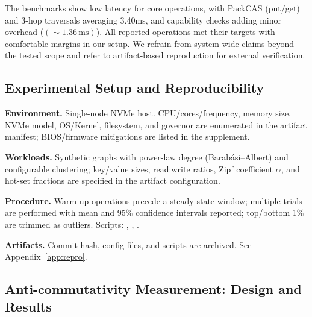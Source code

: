 \documentclass[10pt]{article}
\begin{document}
The benchmarks show low latency for core operations, with PackCAS (put/get) and 3-hop traversals averaging 3.40ms, and capability checks adding minor overhead ($(\sim 1.36\,\mathrm{ms})$). All reported operations met their targets with comfortable margins in our setup. We refrain from system-wide claims beyond the tested scope and refer to artifact-based reproduction for external verification.

\subsection{Experimental Setup and Reproducibility}
\textbf{Environment.} Single-node NVMe host. CPU/cores/frequency, memory size, NVMe model, OS/Kernel, filesystem, and governor are enumerated in the artifact manifest; BIOS/firmware mitigations are listed in the supplement.

\textbf{Workloads.} Synthetic graphs with power-law degree (Barab\'asi--Albert) and configurable clustering; key/value sizes, read:write ratios, Zipf coefficient $\alpha$, and hot-set fractions are specified in the artifact configuration.

\textbf{Procedure.} Warm-up operations precede a steady-state window; multiple trials are performed with mean and 95\% confidence intervals reported; top/bottom 1\% are trimmed as outliers. Scripts: \texttt{}, \texttt{}, \texttt{}.

\textbf{Artifacts.} Commit hash, config files, and scripts are archived. See Appendix~\ref{app:repro}.

\subsection{Anti-commutativity Measurement: Design and Results}
\end{document}
